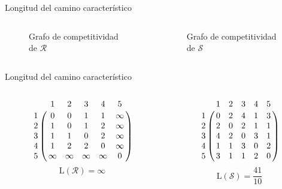 \documentclass[10pt]{beamer}
\begin{document}
	\begin{frame}{Longitud del camino característico}
	\begin{ejemplo}
		\begin{columns}[t] %
			\begin{column}{.50\textwidth}
				\begin{figure}
					\centering
					\resizebox{!}{0.4\textheight}{\ejemplografocompetitividadevolutivo}
					\caption{Grafo de competitividad de $\mathcal{R}$}
				\end{figure}
			\end{column}%
			\hfill%
			\begin{column}{.50\textwidth}
				\begin{figure}
					\centering
					\resizebox{!}{0.4\textheight}{\ejemplofuerzamedia}
					\caption{Grafo de competitividad de $\mathcal{S}$}
				\end{figure}
			\end{column}%
		\end{columns}
	\end{ejemplo}
	\end{frame}
	
	\begin{frame}{Longitud del camino característico}
		\begin{ejemplo}[continuación]
			\begin{columns}[t] %
				\begin{column}{.50\textwidth}
					\begin{equation*}
					\bordermatrix{
						& 1 & 2 & 3 & 4 & 5 \cr
						1 &	0 & 0 & 1 & 1 & \infty \cr
						2 & 1 & 0 & 1 & 2 & \infty \cr
						3 & 1 & 1 & 0 & 2 & \infty \cr
						4 & 1 & 2 & 2 & 0 & \infty \cr
						5 & \infty & \infty & \infty & \infty  &  0  \cr
					}
					\end{equation*}
					\[ \mathrm{L}(\mathcal{R}) = \infty \]
				\end{column}%
				\hfill%
				\begin{column}{.50\textwidth}
					\begin{equation*}
					\bordermatrix{
						& 1 & 2 & 3 & 4 & 5 \cr
						1 &	0 & 2 & 4 & 1 & 3 \cr
						2 & 2 & 0 & 2 & 1 & 1 \cr
						3 & 4 & 2 & 0 & 3 & 1 \cr
						4 & 1 & 1 & 3 & 0 & 2 \cr
						5 & 3 & 1 & 1 & 2 & 0  \cr
					}
					\end{equation*}
					\[ \mathrm{L}(\mathcal{S}) = \dfrac{41}{10} \]
				\end{column}%
			\end{columns}
		\end{ejemplo}
	\end{frame}
	
\end{document}
